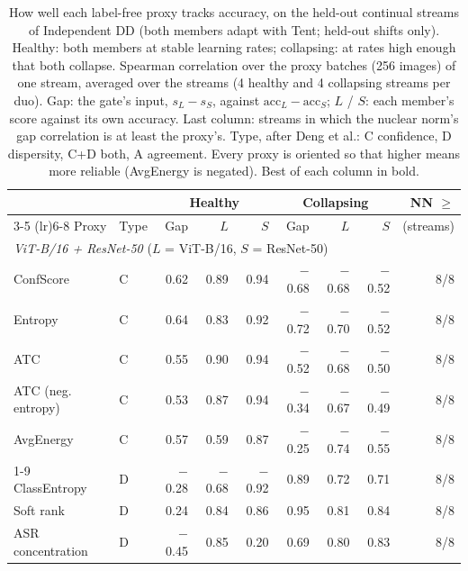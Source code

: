 \begin{table}[t]
\centering
\small
\setlength{\tabcolsep}{4pt}
\caption{How well each label-free proxy tracks accuracy, on the held-out continual streams of Independent DD (both members adapt with Tent; held-out shifts only). Healthy: both members at stable learning rates; collapsing: at rates high enough that both collapse. Spearman correlation over the proxy batches (256 images) of one stream, averaged over the streams (4 healthy and 4 collapsing streams per duo). Gap: the gate's input, $s_L - s_S$, against $\mathrm{acc}_L - \mathrm{acc}_S$; $L$ / $S$: each member's score against its own accuracy. Last column: streams in which the nuclear norm's gap correlation is at least the proxy's. Type, after Deng et al.: C confidence, D dispersity, C+D both, A agreement. Every proxy is oriented so that higher means more reliable (AvgEnergy is negated). Best of each column in bold.}
\label{tab:proxy_correlation}
\begin{tabular}{ll rrr rrr r}
\toprule
 & & \multicolumn{3}{c}{Healthy} & \multicolumn{3}{c}{Collapsing} & NN $\geq$ \\
\cmidrule(lr){3-5} \cmidrule(lr){6-8}
Proxy & Type & Gap & $L$ & $S$ & Gap & $L$ & $S$ & (streams) \\
\midrule
\multicolumn{9}{l}{\textit{ViT-B/16 + ResNet-50} \quad ($L$ = ViT-B/16, $S$ = ResNet-50)} \\
ConfScore & C & \phantom{-}0.62 & \phantom{-}0.89 & \phantom{-}0.94 & $-$0.68 & $-$0.68 & $-$0.52 & 8/8 \\
Entropy & C & \phantom{-}0.64 & \phantom{-}0.83 & \phantom{-}0.92 & $-$0.72 & $-$0.70 & $-$0.52 & 8/8 \\
ATC & C & \phantom{-}0.55 & \phantom{-}0.90 & \phantom{-}0.94 & $-$0.52 & $-$0.68 & $-$0.50 & 8/8 \\
ATC (neg. entropy) & C & \phantom{-}0.53 & \phantom{-}0.87 & \phantom{-}0.94 & $-$0.34 & $-$0.67 & $-$0.49 & 8/8 \\
AvgEnergy & C & \phantom{-}0.57 & \phantom{-}0.59 & \phantom{-}0.87 & $-$0.25 & $-$0.74 & $-$0.55 & 8/8 \\
\cmidrule(l){1-9}
ClassEntropy & D & $-$0.28 & $-$0.68 & $-$0.92 & \phantom{-}0.89 & \phantom{-}0.72 & \phantom{-}0.71 & 8/8 \\
Soft rank & D & \phantom{-}0.24 & \phantom{-}0.84 & \phantom{-}0.86 & \phantom{-}0.95 & \phantom{-}0.81 & \phantom{-}0.84 & 8/8 \\
ASR concentration & D & $-$0.45 & \phantom{-}0.85 & \phantom{-}0.20 & \phantom{-}0.69 & \phantom{-}0.80 & \phantom{-}0.83 & 8/8 \\

\end{tabular}
\end{table}
